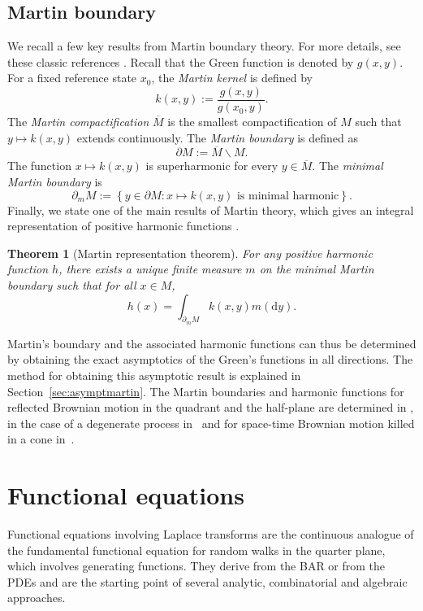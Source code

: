 \documentclass[11pt]{article}
\newcommand\citeS[1]{\cite{#1}}
\newtheorem{thm}{Theorem}[section]
\theoremstyle{definition}
\begin{document}
\subsection{Martin boundary}
We recall a few key results from Martin boundary theory. For more details, see these classic references \cite{chung2005,kunita1963,martin1941,Pinsky1995}. Recall that the Green function is denoted by $g(x,y)$.
For a fixed reference state $x_0$, the \emph{Martin kernel} is defined by
$$
k(x,y):=\frac{g(x,y)}{g(x_0,y)}.
$$
The \emph{Martin compactification} $\overline{M}$ is the smallest compactification of $M$ such that $y \mapsto k(x,y)$ extends continuously. The \emph{Martin boundary} is defined as
$$
\partial M:=\overline{M} \backslash M .
$$
The function $x \mapsto k(x,y)$ is superharmonic for every $y \in \overline{M}$. The \emph{minimal Martin boundary} is
$$
\partial_m M:=\left\{y \in \partial M: x \mapsto k(x,y) \text { is minimal harmonic}\right\} .
$$
Finally, we state one of the main results of Martin theory, which gives an integral representation of positive harmonic functions \cite[Theorem 4]{kunita1963}.
\begin{thm}[Martin representation theorem]
For any positive harmonic function $h$, there exists a unique finite measure $m$ on the minimal Martin boundary such that for all $x \in M$,
$$
h(x)=\int_{\partial_m M} k(x,y) m(\mathrm{d} y).
$$
\end{thm}

Martin’s boundary and the associated harmonic functions can thus be determined by obtaining the exact asymptotics of the Green’s functions in all directions. The method for obtaining this asymptotic result is explained in Section~\ref{sec:asymptmartin}.
The Martin boundaries and harmonic functions for reflected Brownian motion in the quadrant and the half-plane are determined in \citeS{franceschi_kourkova_petit_asymptotics_2024,franceschi_ernst_asymptotic_2021}, in the case of a degenerate process in~\cite{petit2024} and for space-time Brownian motion killed in a cone in~\citeS{franceschi_spacetime_2024}. 






\section{Functional equations}
\label{sec:funceq}

Functional equations involving Laplace transforms are the continuous analogue of the fundamental functional equation for random walks in the quarter plane, which involves generating functions. They derive from the BAR or from the PDEs and are the starting point of several analytic, combinatorial and algebraic approaches.
\end{document}
